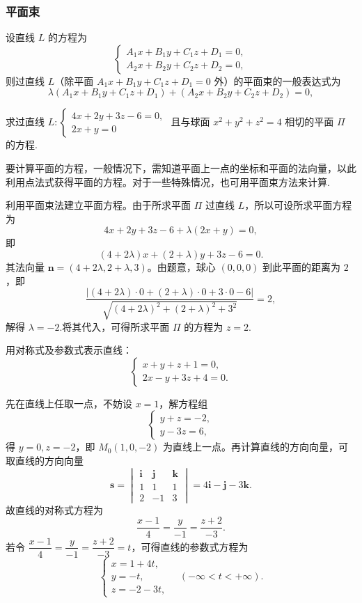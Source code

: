 \subsubsection{平面束}
\begin{zs}
    设直线 $L$ 的方程为
\[
\begin{cases}
A_1x+B_1y+C_1z+D_1=0, \\
A_2x+B_2y+C_2z+D_2=0,
\end{cases}
\]
则过直线 $L$（除平面 $A_1x+B_1y+C_1z+D_1=0$ 外）的平面束的一般表达式为
\[
\lambda(A_1x+B_1y+C_1z+D_1)+(A_2x+B_2y+C_2z+D_2)=0,
\]
\end{zs}
\begin{problem}
   求过直线 $L: \begin{cases} 4x+2y+3z-6=0, \\ 2x+y=0 \end{cases}$ 且与球面 $x^2+y^2+z^2=4$ 相切的平面 $\Pi$ 的方程. 
\end{problem}
\begin{note}
    要计算平面的方程，一般情况下，需知道平面上一点的坐标和平面的法向量，以此利用点法式获得平面的方程。对于一些特殊情况，也可用平面束方法来计算.
\end{note}
\begin{solution}
    利用平面束法建立平面方程。由于所求平面 $\Pi$ 过直线 $L$，所以可设所求平面方程为
\[
4x + 2y + 3z - 6 + \lambda(2x + y) = 0,
\]
即
\[
(4+2\lambda)x + (2+\lambda)y + 3z - 6 = 0.
\]
其法向量 $\boldsymbol{n}=(4+2\lambda,2+\lambda,3)$。由题意，球心 $(0,0,0)$ 到此平面的距离为 $2$，即
\[
\dfrac{|(4+2\lambda)\cdot0 + (2+\lambda)\cdot0 + 3\cdot0 - 6|}{\sqrt{(4+2\lambda)^2+(2+\lambda)^2+3^2}} = 2,
\]
解得 $\lambda = -2$.将其代入，可得所求平面 $\Pi$ 的方程为 $z=2$.
\end{solution}
\begin{problem}
    用对称式及参数式表示直线：\[
\begin{cases}
x + y + z + 1 = 0, \\
2x - y + 3z + 4 = 0.
\end{cases}
\]
\end{problem}
\begin{solution}
    先在直线上任取一点，不妨设 $x=1$，解方程组
\[
\begin{cases}
y + z = -2, \\
y - 3z = 6,
\end{cases}
\]
得 $y=0, z=-2$，即 $M_0(1,0,-2)$ 为直线上一点。再计算直线的方向向量，可取直线的方向向量
\[
\boldsymbol{s} = \begin{vmatrix}
\boldsymbol{i} & \boldsymbol{j} & \boldsymbol{k} \\
1 & 1 & 1 \\
2 & -1 & 3
\end{vmatrix} = 4\boldsymbol{i} - \boldsymbol{j} - 3\boldsymbol{k}.
\]
故直线的对称式方程为
\[
\dfrac{x-1}{4} = \dfrac{y}{-1} = \dfrac{z+2}{-3}.
\]
若令 $\dfrac{x-1}{4} = \dfrac{y}{-1} = \dfrac{z+2}{-3} = t$，可得直线的参数式方程为
\[
\begin{cases}
x = 1 + 4t, \\
y = -t, \\
z = -2 - 3t,
\end{cases}
\quad (-\infty < t < +\infty).
\]
\end{solution}

